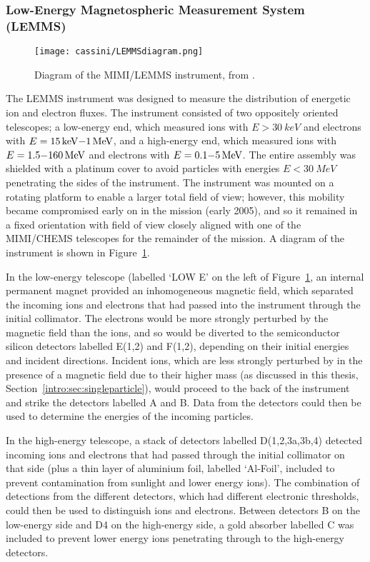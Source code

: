 \subsubsection{Low-Energy Magnetospheric Measurement System (LEMMS)}
\begin{figure}
\centering
\noindent\texttt{[image: cassini/LEMMSdiagram.png]}
\caption[Diagram of the MIMI/LEMMS instrument.]{Diagram of the MIMI/LEMMS instrument, from \citet{krimigis2004}.}
\label{cassini:fig:LEMMSdiagram}
\end{figure}

The LEMMS instrument was designed to measure the distribution of energetic ion and electron fluxes. The instrument consisted of two oppositely oriented telescopes; a low-energy end, which measured ions with $E>\SI{30}{keV}$ and electrons with $E=\SI{15}{keV}{\--}\SI{1}{MeV}$, and a high-energy end, which measured ions with $E=1.5{\--}\SI{160}{MeV}$ and electrons with $E=0.1{\--}\SI{5}{MeV}$. The entire assembly was shielded with a platinum cover to avoid particles with energies $E<\SI{30}{MeV}$ penetrating the sides of the instrument. The instrument was mounted on a rotating platform to enable a larger total field of view; however, this mobility became compromised early on in the mission (early 2005), and so it remained in a fixed orientation with field of view closely aligned with one of the MIMI/CHEMS telescopes for the remainder of the mission. A diagram of the instrument is shown in Figure~\ref{cassini:fig:LEMMSdiagram}.

In the low-energy telescope (labelled `LOW E' on the left of Figure~\ref{cassini:fig:LEMMSdiagram}, an internal permanent magnet provided an inhomogeneous magnetic field, which separated the incoming ions and electrons that had passed into the instrument through the initial collimator. The electrons would be more strongly perturbed by the magnetic field than the ions, and so would be diverted to the semiconductor silicon detectors labelled E(1,2) and F(1,2), depending on their initial energies and incident directions. Incident ions, which are less strongly perturbed by in the presence of a magnetic field due to their higher mass (as discussed in this thesis, Section~\ref{intro:sec:singleparticle}), would proceed to the back of the instrument and strike the detectors labelled A and B. Data from the detectors could then be used to determine the energies of the incoming particles. 

In the high-energy telescope, a stack of detectors labelled D(1,2,3a,3b,4) detected incoming ions and electrons that had passed through the initial collimator on that side (plus a thin layer of aluminium foil, labelled `Al-Foil', included to prevent contamination from sunlight and lower energy ions). The combination of detections from the different detectors, which had different electronic thresholds, could then be used to distinguish ions and electrons. Between detectors B on the low-energy side and D4 on the high-energy side, a gold absorber labelled C was included to prevent lower energy ions penetrating through to the high-energy detectors.

